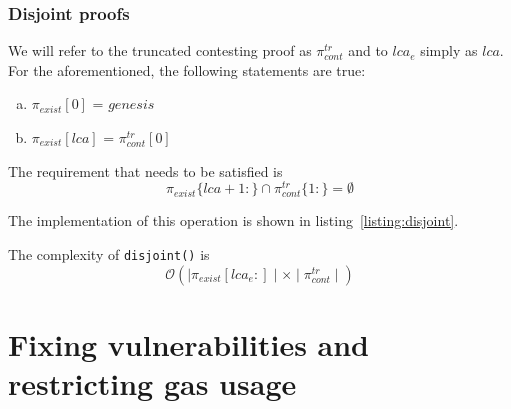 \newcommand*{\exist}{$\pi_{exist}$}
\newcommand*{\cont}{$\pi_{cont}^{tr}$}

\subsubsection{Disjoint proofs}

We will refer to the truncated contesting proof as $\pi_{cont}^{tr}$ and to
$lca_{e}$ simply as $lca$. For the aforementioned, the following statements are
true:

\begin{enumerate}[(a)]
    \item  $\pi_{exist}[0]$ = $genesis$
    \item  $\pi_{exist}[lca]$ = $\pi_{cont}^{tr}[0]$
\end{enumerate}

The requirement that needs to be satisfied is
\[\pi_{exist}\{lca+1:\} \cap \pi_{cont}^{tr}\{1:\} = \emptyset \]

The implementation of this operation is shown in
listing~\ref{listing:disjoint}.



The complexity of \texttt{disjoint()} is
\[ \mathcal{O}(\mid\pi_{exist}[lca_{e}:]\mid \times
\mid\pi_{cont}^{tr}\mid) \]

\section{Fixing vulnerabilities and restricting gas usage}

%
%

